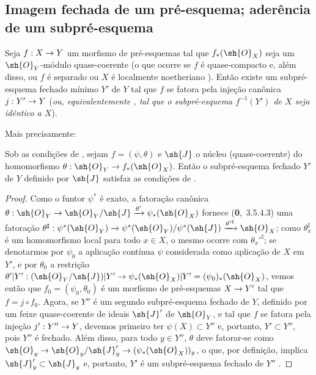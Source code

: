 \documentclass[oneside]{amsart}
\makeatletter
\newcommand{\ega@arrow}[2]{\mathchoice{#1}{#2}{#2}{#2}}
\renewcommand{\to}{\ega@arrow{\longrightarrow}{\rightarrow}}
\newcommand{\oldpage}[2][]{{\marginnote{\normalfont\textbf{#1}~|~#2}}\ignorespaces}
\let\EGAOriginalLabel\label
\renewcommand{\label}[1]{\phantomsection\EGAOriginalLabel{#1}}
\newcommand*{\ega@errmark}[1]{\textbf{Err}\textsubscript{#1}}
\newcommand{\erratum}[2][]{{#2}\marginpar{\footnotesize\ega@errmark{#1}}}
\makeatother
\begin{document}
\subsection{Imagem fechada de um pré-esquema; aderência de um subpré-esquema}
\label{subsection:I.9.5}

\begin{proposition}[9.5.1]
\label{I.9.5.1}
Seja $f:X\to Y$ um morfismo de pré-esquemas tal que $f_*(\sh{O}_X)$ seja um
$\sh{O}_Y$-módulo quase-coerente (o que ocorre se $f$ é quase-compacto e, além disso,
ou $f$ é separado ou $X$ é localmente noetheriano ). Então existe um
subpré-esquema fechado mínimo $Y'$ de $Y$ tal que $f$ se fatora pela injeção canônica
$j:Y'\to Y$ (\emph{ou, equivalentemente , tal que o subpré-esquema
$f^{-1}(Y')$ de $X$ seja \emph{idêntico} a $X$}).
\end{proposition}

Mais precisamente:
\begin{corollary}[9.5.2]
\label{I.9.5.2}
Sob as condições de , sejam $f=(\psi,\theta)$ e $\sh{J}$ o
núcleo (quase-coerente) do homomorfismo $\theta:\sh{O}_Y\to f_*(\sh{O}_X)$. Então o
subpré-esquema fechado $Y'$ de $Y$ definido por $\sh{J}$ satisfaz as condições de
.
\end{corollary}

\begin{proof}
Como o funtor $\psi^*$ é exato, a fatoração canônica
$\theta:\sh{O}_Y\to\sh{O}_Y/\sh{J}\xrightarrow{\theta'}\psi_*(\sh{O}_X)$ fornece (\textbf{0},~3.5.4.3)
uma fatoração
$\theta^\sharp:\psi^*(\sh{O}_Y)\to\psi^*(\sh{O}_Y)/\psi^*(\sh{J})
  \xrightarrow{{\theta'}^\sharp}\sh{O}_X$; como $\theta_x^\sharp$ é um homomorfismo local para
todo $x\in X$, o mesmo ocorre com ${\theta_x'}^\sharp$; se denotarmos por $\psi_0$ a
aplicação contínua $\psi$ considerada como aplicação de $X$ em \erratum[II]{$Y'$}, e por $\theta_0$ a restrição
$\theta'|Y':(\sh{O}_Y/\sh{J})|Y'\to\psi_*(\sh{O}_X)|Y'=(\psi_0)_*(\sh{O}_X)$, vemos então que
$f_0=(\psi_0,\theta_0)$ é um morfismo de pré-esquemas $X\to Y'$  tal que
$f=j\circ f_0$. Agora, se $Y''$
\oldpage[I]{177}
é um segundo subpré-esquema fechado de $Y$, definido por um feixe quase-coerente de ideais $\sh{J}'$ de
$\sh{O}_Y$, e tal que $f$ se fatora pela injeção $j':Y''\to Y$, devemos primeiro ter
$\psi(X)\subset Y''$ e, portanto, $Y'\subset Y''$, pois $Y''$ é fechado.
Além disso, para todo $y\in Y''$, $\theta$ deve fatorar-se como
$\sh{O}_y\to\sh{O}_y/\sh{J}'_y\to(\psi_*(\sh{O}_X))_y$, o que, por definição, implica
$\sh{J}'_y\subset\sh{J}_y$ e, portanto, $Y'$ é um subpré-esquema fechado de $Y''$
.
\end{proof}
\end{document}
